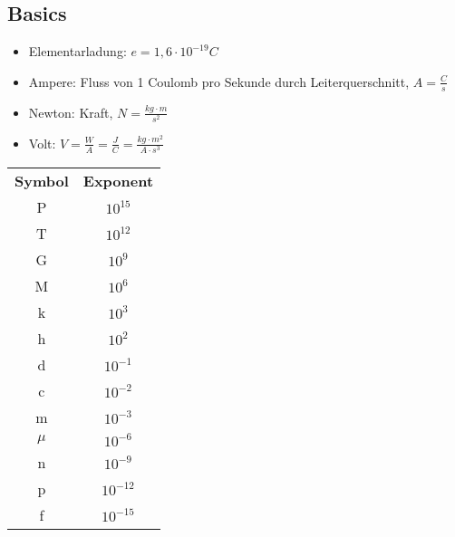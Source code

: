 \subsection*{Basics}
    \begin{itemize}
        \item Elementarladung: $e = 1,6 \cdot 10^{-19} C$
        \item Ampere: Fluss von 1 Coulomb pro Sekunde durch Leiterquerschnitt, $A = \frac{C}{s}$
        \item Newton: Kraft, $N = \frac{kg \cdot m}{s^2}$
        \item Volt: $V = \frac{W}{A} = \frac{J}{C} = \frac{kg \cdot m^2}{A \cdot s^3}$
    \end{itemize}
    
    \begin{tabular}{c c}
        \textbf{Symbol} & \textbf{Exponent}\\
        P & $10^{15}$ \\
        T & $10^{12}$ \\
        G & $10^9$ \\
        M & $10^6$ \\
        k & $10^3$ \\
        h & $10^2$ \\
        d & $10^{-1}$ \\
        c & $10^{-2}$ \\
        m & $10^{-3}$ \\
        $\mu$ & $10^{-6}$ \\
        n & $10^{-9}$ \\
        p & $10^{-12}$ \\
        f & $10^{-15}$ \\
    \end{tabular}